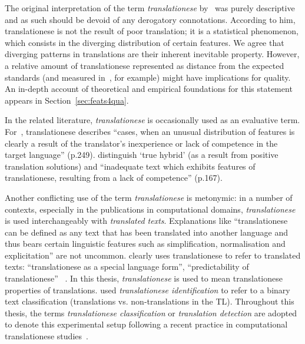 The original interpretation of the term \textit{translationese} by~\citet{Gellerstam1986} was purely descriptive and as such should be devoid of any derogatory connotations. According to him, translationese is not the result of poor translation; it is a statistical phenomenon, which consists in the diverging distribution of certain features.
We agree that diverging patterns in translations are their inherent inevitable property. However, a relative amount of translationese represented as distance from the expected standards (and measured in~\citet{Sutter2017}, for example) might have implications for quality. An in-depth account of theoretical and empirical foundations for this statement appears in Section~\ref{sec:feats4qua}. 

In the related literature, \textit{translationese} is occasionally used as an \hypertarget{wd:evaluative}{evaluative} term. For~\citet{Baker1993}, translationese describes ``cases, when an unusual distribution of features is clearly a result of the translator's inexperience or lack of competence in the target language'' (p.249). \citet{BlumKulka1986} distinguish `true hybrid' (as a result from positive translation solutions) and ``inadequate text which exhibits features of translationese, resulting from a lack of competence'' (p.167). 

Another conflicting use of the term \textit{translationese} is metonymic: in a number of contexts, especially in the publications in computational domains, \textit{translationese} is used interchangeably with \textit{translated texts}. Explanations like ``translationese can be defined as any text that has been translated into another language and thus bears certain linguistic features such as simplification, normalisation and explicitation'' are not uncommon. \citet{Nikolaev2020} clearly uses translationese to refer to translated texts: ``translationese as a special language form'', ``predictability of translationese'' ~\cite[see also  ``$\dots$ contains elements of both original text and translationese'' in ][p.52]{Carter2012}. 
In this thesis, \textit{translationese} is used to mean translationese properties of translations.
\citet{Popescu2011} used \textit{translationese identification} to refer to a binary text classification (translations vs. non-translations in the TL). Throughout this thesis, the terms \textit{translationese classification} or \textit{translation detection} are adopted to denote this experimental setup following a recent practice in computational translationese studies~\cite[see, for example,][]{Pylypenko2021}. 

